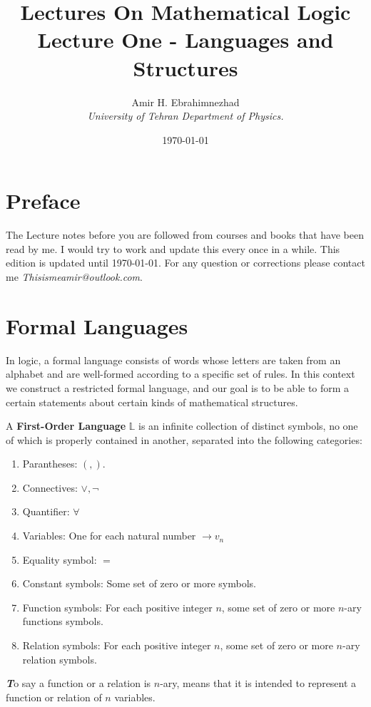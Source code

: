 \documentclass[9pt,a4paper, twocolumn]{article}
\title{Lectures On Mathematical Logic\\ \large Lecture One - Languages and Structures}
\date{\today}
\author{Amir H. Ebrahimnezhad \\ \small \textit{University of Tehran Department of Physics.}}
\newenvironment{callout}
	{\begin{calloutbox}\color{charcoal}\textbf\textit}
	{\end{calloutbox}}
\newcommand{\curveL}{\mathbb{L} }
\begin{document}
    \maketitle
    \section*{Preface}
    The Lecture notes before you are followed from courses and books that have been read by me. I would try to work and update this every once in a while. This edition is updated until \today. For any question or corrections please contact me \textit{Thisismeamir@outlook.com}.
    \section*{Formal Languages}
        In logic, a formal language consists of words whose letters are taken from an alphabet and are well-formed according to a specific set of rules. In this context we construct a restricted formal language, and our goal is to be able to form a certain statements about certain kinds of mathematical structures.
        \begin{define}
            A \textbf{First-Order Language} $\curveL$ is an infinite collection of distinct symbols, no one of which is properly contained in another, separated into the following categories:
            \begin{enumerate}
                \item Parantheses: $(,)$.
                \item Connectives: $\lor, \neg$
                \item Quantifier: $\forall$
                \item Variables: One for each natural number $\rightarrow v_n$
                \item Equality symbol: $=$
                \item Constant symbols: Some set of zero or more symbols.
                \item Function symbols: For each positive integer $n$, some set of zero or more $n$-ary functions symbols.
                \item Relation symbols: For each positive integer $n$, some set of zero or more $n$-ary relation symbols.
            \end{enumerate}
        \end{define}
        \begin{callout}
            To say a function or a relation is $n$-ary, means that it is intended to represent a function or relation of $n$ variables.
        \end{callout}
\end{document}
